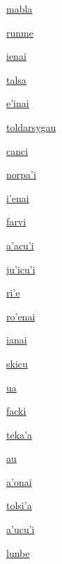 {\hyperlink{val:mabla}{mabla}}{}{}{}

{\hyperlink{val:runme}{runme}}{}{}{}

{\hyperlink{val:ienai}{ienai}}{}{}{}

{\hyperlink{val:talsa}{talsa}}{}{}{}

{\hyperlink{val:ehinai}{e'inai}}{}{}{}

{\hyperlink{val:toldarsygau}{toldarsygau}}{}{}{}

{\hyperlink{val:canci}{canci}}{}{}{}

{\hyperlink{val:norpahi}{norpa'i}}{}{}{}

{\hyperlink{val:ihenai}{i'enai}}{}{}{}

{\hyperlink{val:farvi}{farvi}}{}{}{}

{\hyperlink{val:ahacuhi}{a'acu'i}}{}{}{}

{\hyperlink{val:juhicuhi}{ju'icu'i}}{}{}{}

{\hyperlink{val:rihe}{ri'e}}{}{}{}

{\hyperlink{val:rohenai}{ro'enai}}{}{}{}

{\hyperlink{val:ianai}{ianai}}{}{}{}

{\hyperlink{val:skicu}{skicu}}{}{}{}

{\hyperlink{val:ua}{ua}}{}{}{}

{\hyperlink{val:facki}{facki}}{}{}{}

{\hyperlink{val:tekaha}{teka'a}}{}{}{}

{\hyperlink{val:au}{au}}{}{}{}

{\hyperlink{val:ahonai}{a'onai}}{}{}{}

{\hyperlink{val:tolsiha}{tolsi'a}}{}{}{}

{\hyperlink{val:ahucuhi}{a'ucu'i}}{}{}{}

{\hyperlink{val:lunbe}{lunbe}}{}{}{}

